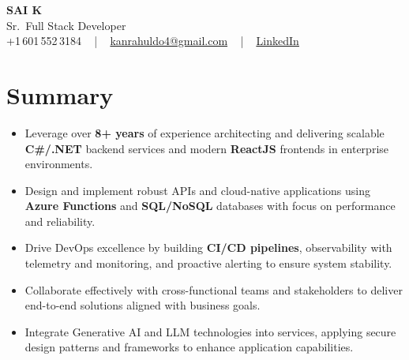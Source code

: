 \documentclass[letterpaper,11pt]{article}
\newcommand{\resumeItem}[1]{
  \item\footnotesize{
    {#1 \vspace{-2pt}}
  }
}
\newcommand{\resumeItemListStart}{\begin{itemize}[leftmargin=*]}
\newcommand{\resumeItemListEnd}{\end{itemize}\vspace{-5pt}}
\begin{document}
\begin{center}
    {\fontsize{14pt}{12pt}\selectfont \textbf{\MakeUppercase{Sai K}}}\\ \vspace{2pt}
    \fontsize{10pt}{12pt}\selectfont Sr.\ Full Stack Developer\\ \vspace{2pt}
    \fontsize{10pt}{12pt}\selectfont +1\,601\,552\,3184 ~ | ~
    \href{mailto:kanrahuldo4@gmail.com}{kanrahuldo4@gmail.com} ~ | ~
    \href{https://www.linkedin.com/in/srrrk/}{\color{blue}\underline{LinkedIn}}
    \vspace{-10pt}
\end{center}

\section{Summary}
\fontsize{9pt}{10pt}\selectfont
\resumeItemListStart
  \resumeItem{Leverage over \textbf{8+ years} of experience architecting and delivering scalable \textbf{C\#/.NET} backend services and modern \textbf{ReactJS} frontends in enterprise environments.}
  \resumeItem{Design and implement robust APIs and cloud-native applications using \textbf{Azure Functions} and \textbf{SQL/NoSQL} databases with focus on performance and reliability.}
  \resumeItem{Drive DevOps excellence by building \textbf{CI/CD pipelines}, observability with telemetry and monitoring, and proactive alerting to ensure system stability.}
  \resumeItem{Collaborate effectively with cross-functional teams and stakeholders to deliver end-to-end solutions aligned with business goals.}
  \resumeItem{Integrate Generative AI and LLM technologies into services, applying secure design patterns and frameworks to enhance application capabilities.}
\resumeItemListEnd
\vspace{-6pt}

\end{document}
